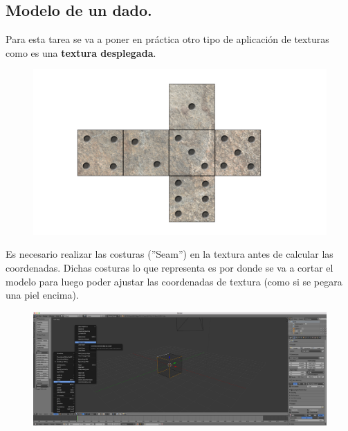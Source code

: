 \documentclass[10pt]{article}
\begin{document}
\subsection{Modelo de un dado.}  

Para esta tarea se va a poner en práctica otro tipo de aplicación de texturas como es una \textbf{textura desplegada}. \\

\begin{figure}[H]
	\begin{center}
	 		\includegraphics[width = 1.00\textwidth]{Imagenes/p3-img8}
	\end{center} 
\end{figure}

Es necesario realizar las costuras (''Seam'') en la textura antes de calcular las coordenadas. Dichas costuras lo que representa es por donde se va a cortar el modelo para luego poder ajustar las coordenadas de textura (como si se pegara una piel encima). \\

\begin{figure}[H]
	\begin{center}
	 		\includegraphics[width = 1.00\textwidth]{Imagenes/p3-img9}
	\end{center} 
\end{figure}
\end{document}
